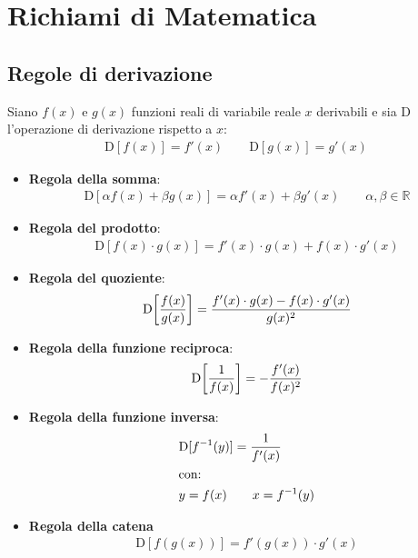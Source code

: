 
\chapter{Richiami di Matematica}
\label{cha:matematica}

\section{Regole di derivazione}
\label{sec:regole_di_derivazione}

Siano $f(x)$ e $g(x)$ funzioni reali di variabile reale $x$ derivabili e sia $\mathrm{D}$ l'operazione di derivazione rispetto a $x$:
\begin{align*}
	\mathrm{D}[f(x)]=f'(x) \qquad \mathrm{D}[g(x)]=g'(x)
\end{align*}
\begin{itemize}
	\item \textbf{Regola della somma}:
	\begin{align*}
		\mathrm{D}[\alpha f(x)+ \beta g(x)] = \alpha f'(x) + \beta g'(x) \qquad \alpha, \beta \in \mathbb{R}
	\end{align*}
	\item \textbf{Regola del prodotto}:
	\begin{align*}
		\mathrm{D} [ {f(x) \cdot g(x)}] = f'(x) \cdot g(x) + f(x) \cdot g'(x) 
	\end{align*}
	\item \textbf{Regola del quoziente}:
	\begin{align*}
		\mathrm{D}\! \left[ {f(x) \over g(x)} \right] = { f'(x)  \cdot g(x) - f(x) \cdot g'(x) \over g(x)^2}
	\end{align*}
	\item \textbf{Regola della funzione reciproca}:
	\begin{align*}
		\mathrm{D}\! \left[ {1 \over f(x)} \right] = -{f'(x) \over f(x)^2} 
	\end{align*}
	\item \textbf{Regola della funzione inversa}:
	\begin{align*}
		&\mathrm{D}[f^{-1}(y)]  =  {1 \over f'(x)} \\
		&\text{con:} \\
		&y = {f(x)} \qquad x = {f^{-1}(y)}
	\end{align*}
	\item \textbf{Regola della catena}
	\begin{align*}
		\mathrm{D} \left[ f \left( g(x) \right) \right] = f' \left( g(x) \right) \cdot g'(x) 
	\end{align*}
\end{itemize}


